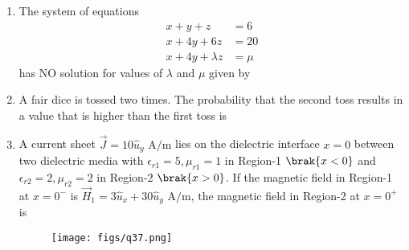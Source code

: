 \documentclass[a4paper, 11pt]{article}
\begin{document}
\begin{enumerate}
    \hfill{}

    \item The system of equations
    \begin{align*}
        x+y+z &= 6 \\
        x+4y+6z &= 20 \\
        x+4y+\lambda z &= \mu
    \end{align*}
    has NO solution for values of $\lambda$ and $\mu$ given by
    
    \begin{enumerate}
    \end{enumerate}

    \hfill{}

    \item A fair dice is tossed two times. The probability that the second toss results in a value that is higher than the first toss is
    
    \begin{enumerate}
    \end{enumerate}

    \hfill{}

    \item A current sheet $\vec{J}=10\hat{u}_{y} \text{ A/m}$ lies on the dielectric interface $x=0$ between two dielectric media with $\epsilon_{r1}=5, \mu_{r1}=1$ in Region-1 $\brak{x<0}$ and $\epsilon_{r2}=2, \mu_{r2}=2$ in Region-2 $\brak{x>0}$. If the magnetic field in Region-1 at $x=0^{-}$ is $\vec{H}_{1}=3\hat{u}_{x}+30\hat{u}_{y} \text{ A/m}$, the magnetic field in Region-2 at $x=0^{+}$ is
    
    \begin{figure}[H]
        \centering
        \texttt{[image: figs/q37.png]}
        \caption*{}
        \label{fig:q37}
    \end{figure}
    

\end{enumerate}
\end{document}
